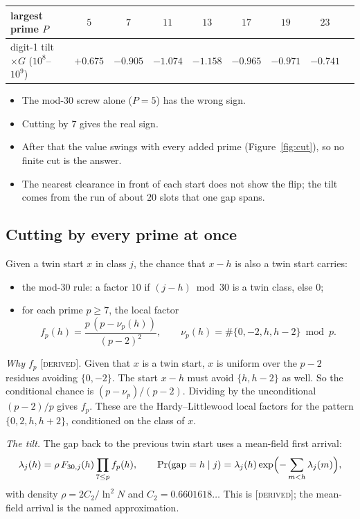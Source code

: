 \documentclass[11pt]{article}
\theoremstyle{definition}
\theoremstyle{remark}
\newcommand{\grade}[1]{\textsc{[#1]}}
\begin{document}
\begin{center}
\begin{tabular}{lcccccccc}
\toprule
largest prime $P$ & $5$ & $7$ & $11$ & $13$ & $17$ & $19$ & $23$\\
\midrule
digit-1 tilt $\times G$ ($10^8$--$10^9$) & $+0.675$ & $-0.905$ & $-1.074$ & $-1.158$ & $-0.965$ & $-0.971$ & $-0.741$\\
\bottomrule
\end{tabular}
\end{center}

\begin{itemize}
\item The mod-30 screw alone ($P=5$) has the wrong sign.
\item Cutting by $7$ gives the real sign.
\item After that the value swings with every added prime (Figure~\ref{fig:cut}), so no finite cut is the answer.
\item The nearest clearance in front of each start does not show the flip; the tilt comes from the run of about $20$ slots that one gap spans.
\end{itemize}

\subsection{Cutting by every prime at once}
Given a twin start $x$ in class $j$, the chance that $x-h$ is also a twin start carries:
\begin{itemize}
\item the mod-30 rule: a factor $10$ if $(j-h)\bmod 30$ is a twin class, else $0$;
\item for each prime $p\ge7$, the local factor
\[
f_p(h)=\frac{p\,(p-\nu_p(h))}{(p-2)^2},\qquad \nu_p(h)=\#\{0,-2,h,h-2\}\bmod p .
\]
\end{itemize}

\noindent\emph{Why $f_p$} \grade{derived}. Given that $x$ is a twin start, $x$ is uniform over the $p-2$ residues avoiding $\{0,-2\}$. The start $x-h$ must avoid $\{h,h-2\}$ as well. So the conditional chance is $(p-\nu_p)/(p-2)$. Dividing by the unconditional $(p-2)/p$ gives $f_p$. These are the Hardy--Littlewood local factors for the pattern $\{0,2,h,h+2\}$, conditioned on the class of $x$.

\noindent\emph{The tilt.} The gap back to the previous twin start uses a mean-field first arrival:
\[
\lambda_j(h)=\rho\,F_{30,j}(h)\prod_{7\le p}f_p(h),\qquad
\Pr(\text{gap}=h\mid j)=\lambda_j(h)\exp\Bigl(-\sum_{m<h}\lambda_j(m)\Bigr),
\]
with density $\rho=2C_2/\ln^2N$ and $C_2=0.6601618\ldots$ This is \grade{derived}; the mean-field arrival is the named approximation.
\end{document}
